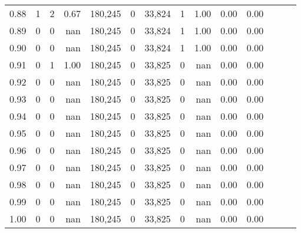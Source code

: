 \begin{tabular}{rrrrrrrrrrrrrr}
0.88 &       1 &      2 &  0.67 &  180,245 &        0 &  33,824 &       1 &  1.00 &  0.00 &      0.00 \\
0.89 &       0 &      0 &   nan &  180,245 &        0 &  33,824 &       1 &  1.00 &  0.00 &      0.00 \\
0.90 &       0 &      0 &   nan &  180,245 &        0 &  33,824 &       1 &  1.00 &  0.00 &      0.00 \\
0.91 &       0 &      1 &  1.00 &  180,245 &        0 &  33,825 &       0 &   nan &  0.00 &      0.00 \\
0.92 &       0 &      0 &   nan &  180,245 &        0 &  33,825 &       0 &   nan &  0.00 &      0.00 \\
0.93 &       0 &      0 &   nan &  180,245 &        0 &  33,825 &       0 &   nan &  0.00 &      0.00 \\
0.94 &       0 &      0 &   nan &  180,245 &        0 &  33,825 &       0 &   nan &  0.00 &      0.00 \\
0.95 &       0 &      0 &   nan &  180,245 &        0 &  33,825 &       0 &   nan &  0.00 &      0.00 \\
0.96 &       0 &      0 &   nan &  180,245 &        0 &  33,825 &       0 &   nan &  0.00 &      0.00 \\
0.97 &       0 &      0 &   nan &  180,245 &        0 &  33,825 &       0 &   nan &  0.00 &      0.00 \\
0.98 &       0 &      0 &   nan &  180,245 &        0 &  33,825 &       0 &   nan &  0.00 &      0.00 \\
0.99 &       0 &      0 &   nan &  180,245 &        0 &  33,825 &       0 &   nan &  0.00 &      0.00 \\
1.00 &       0 &      0 &   nan &  180,245 &        0 &  33,825 &       0 &   nan &  0.00 &      0.00 \\
\bottomrule
\end{tabular}
